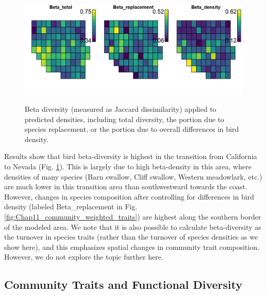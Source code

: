 \begin{figure}[!ht]
    \caption[Beta diversity for bird community]{Beta diversity (measured as Jaccard dissimilarity) applied to predicted densities, including total diversity, the portion due to species replacement, or the portion due to overall differences in bird density.}
    \includegraphics[width=5.5in]{Chap_11/Beta_diversity.png}
    \label{fig:beta_diversity}
\end{figure}

Results show that bird beta-diversity is highest in the transition from California to Nevada (Fig. \ref{fig:beta_diversity}).  This is largely due to high beta-density in this area, where densities of many species (Barn swallow, Cliff swallow, Western meadowlark, etc.) are much lower in this transition area than southwestward towards the coast.  However, changes in species composition after controlling for differences in bird density (labeled \colorbox{backcolour}{Beta\_replacement} in Fig. \ref{fig:Chap11_community_weighted_traits}) are highest along the southern border of the modeled area.  We note that it is also possible to calculate beta-diversity as the turnover in species traits (rather than the turnover of species densities as we show here), and this emphasizes spatial changes in community trait composition.  However, we do not explore the topic further here.  

\subsection{Community Traits and Functional Diversity}

